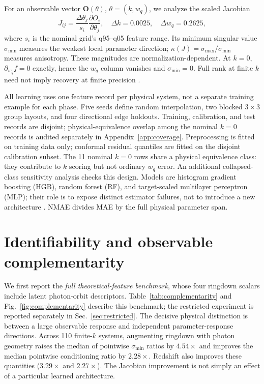 \documentclass{article}
\newcommand{\smin}{\sigma_{\min}}
\begin{document}
For an observable vector $\mathbf O(\theta)$, $\theta=(k,w_q)$, we analyze the scaled Jacobian
\begin{equation}
 J_{ij}=\frac{\Delta\theta_j}{s_i}\frac{\partial O_i}{\partial\theta_j},\quad \Delta k=0.0025,\quad \Delta w_q=0.2625,
\end{equation}
where $s_i$ is the nominal grid's q95--q05 feature range. Its minimum singular value $\smin$ measures the weakest local parameter direction; $\kappa(J)=\sigma_{\max}/\smin$ measures anisotropy. These magnitudes are normalization-dependent. At $k=0$, $\partial_{w_q}f=0$ exactly, hence the $w_q$ column vanishes and $\smin=0$. Full rank at finite $k$ need not imply recovery at finite precision \citep{raue2009,villaverde2016}.

All learning uses one feature record per physical system, not a separate training example for each phase. Five seeds define random interpolation, two blocked $3\times3$ group layouts, and four directional edge holdouts. Training, calibration, and test records are disjoint; physical-equivalence overlap among the nominal $k=0$ records is audited separately in Appendix~\ref{app:coverage}. Preprocessing is fitted on training data only; conformal residual quantiles are fitted on the disjoint calibration subset. The 11 nominal $k=0$ rows share a physical equivalence class: they contribute to $k$ scoring but not ordinary $w_q$ error. An additional collapsed-class sensitivity analysis checks this design. Models are histogram gradient boosting (HGB), random forest (RF), and target-scaled multilayer perceptron (MLP); their role is to expose distinct estimator failures, not to introduce a new architecture \citep{breiman2001,pedregosa2011}. NMAE divides MAE by the full physical parameter span.

\section{Identifiability and observable complementarity}
We first report the \emph{full theoretical-feature benchmark}, whose four ringdown scalars include latent photon-orbit descriptors. Table~\ref{tab:complementarity} and Fig.~\ref{fig:complementarity} describe this benchmark; the restricted experiment is reported separately in Sec.~\ref{sec:restricted}. The decisive physical distinction is between a large observable response and independent parameter-response directions. Across 110 finite-$k$ systems, augmenting ringdown with photon geometry raises the median of pointwise $\smin$ ratios by $4.54\times$ and improves the median pointwise conditioning ratio by $2.28\times$. Redshift also improves these quantities ($3.29\times$ and $2.27\times$). The Jacobian improvement is not simply an effect of a particular learned architecture.
\end{document}
